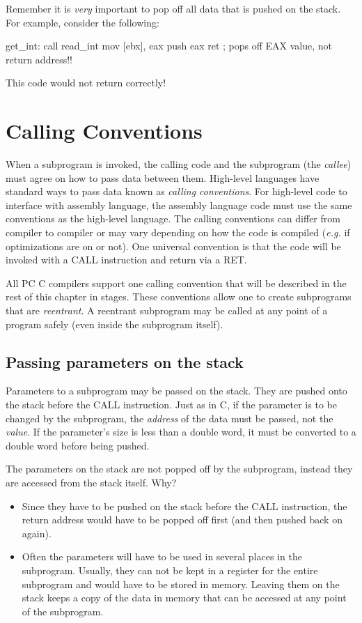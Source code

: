 Remember it is \emph{very} important to pop off all data that is pushed
on the stack. For example, consider the following:
\begin{AsmCodeListing}[frame=none]
get_int:
      call   read_int
      mov    [ebx], eax
      push   eax
      ret                  ; pops off EAX value, not return address!!
\end{AsmCodeListing}
This code would not return correctly!

\section{Calling Conventions}

When a subprogram is invoked, the calling code and the subprogram (the
\emph{callee}) must agree on how to pass data between them. High-level
languages have standard ways to pass data known as \emph{calling 
conventions}. For high-level code to interface with assembly language, the
assembly language code must use the same conventions as the high-level
language. The calling conventions can differ from compiler to compiler or
may vary depending on how the code is compiled (\emph{e.g.} if
optimizations are on or not). One universal convention is that the code will
be invoked with a {\code CALL} instruction and return via a {\code RET}.

All PC C compilers support one calling convention that will be
described in the rest of this chapter in stages. These conventions
allow one to create subprograms that are \emph{reentrant}. A reentrant
subprogram may be called at any point of a program safely (even inside
the subprogram itself).

\subsection{Passing parameters on the stack}

Parameters to a subprogram may be passed on the stack. They are pushed onto
the stack before the {\code CALL} instruction. Just as in C, if the
parameter is to be changed by the subprogram, the \emph{address} of the 
data must be passed, not the \emph{value}. If the parameter's size is less
than a double word, it must be converted to a double word before being pushed.

The parameters on the stack are not popped off by the subprogram, instead
they are accessed from the stack itself. Why?
\begin{itemize}
\item Since they have to be pushed on the stack before the {\code CALL}
instruction, the return address would have to be popped off first (and
then pushed back on again).
\item Often the parameters will have to be used in several places in the
subprogram. Usually, they can not be kept in a register for the entire
subprogram and would have to be stored in memory. Leaving them on the
stack keeps a copy of the data in memory that can be accessed at any
point of the subprogram.
\end{itemize}

